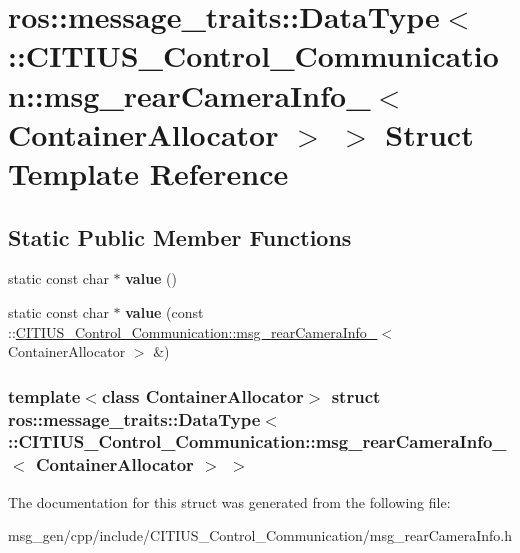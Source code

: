 \hypertarget{structros_1_1message__traits_1_1_data_type_3_01_1_1_c_i_t_i_u_s___control___communication_1_1msgbd70593100054f1c15bc64e53c04fa51}{\section{ros\-:\-:message\-\_\-traits\-:\-:\-Data\-Type$<$ \-:\-:\-C\-I\-T\-I\-U\-S\-\_\-\-Control\-\_\-\-Communication\-:\-:msg\-\_\-rear\-Camera\-Info\-\_\-$<$ \-Container\-Allocator $>$ $>$ \-Struct \-Template \-Reference}
\label{structros_1_1message__traits_1_1_data_type_3_01_1_1_c_i_t_i_u_s___control___communication_1_1msgbd70593100054f1c15bc64e53c04fa51}
}
\subsection*{\-Static \-Public \-Member \-Functions}
\begin{DoxyCompactItemize}
\item 
\hypertarget{structros_1_1message__traits_1_1_data_type_3_01_1_1_c_i_t_i_u_s___control___communication_1_1msgbd70593100054f1c15bc64e53c04fa51_af728ed2c05e40191b0fa31083e806a2a}{static const char $\ast$ {\bfseries value} ()}\label{structros_1_1message__traits_1_1_data_type_3_01_1_1_c_i_t_i_u_s___control___communication_1_1msgbd70593100054f1c15bc64e53c04fa51_af728ed2c05e40191b0fa31083e806a2a}

\item 
\hypertarget{structros_1_1message__traits_1_1_data_type_3_01_1_1_c_i_t_i_u_s___control___communication_1_1msgbd70593100054f1c15bc64e53c04fa51_ad3b3e2f3cbcb9c596cf83367c9606c5b}{static const char $\ast$ {\bfseries value} (const \-::\hyperlink{struct_c_i_t_i_u_s___control___communication_1_1msg__rear_camera_info__}{\-C\-I\-T\-I\-U\-S\-\_\-\-Control\-\_\-\-Communication\-::msg\-\_\-rear\-Camera\-Info\-\_\-}$<$ \-Container\-Allocator $>$ \&)}\label{structros_1_1message__traits_1_1_data_type_3_01_1_1_c_i_t_i_u_s___control___communication_1_1msgbd70593100054f1c15bc64e53c04fa51_ad3b3e2f3cbcb9c596cf83367c9606c5b}

\end{DoxyCompactItemize}
\subsubsection*{template$<$class Container\-Allocator$>$ struct ros\-::message\-\_\-traits\-::\-Data\-Type$<$ \-::\-C\-I\-T\-I\-U\-S\-\_\-\-Control\-\_\-\-Communication\-::msg\-\_\-rear\-Camera\-Info\-\_\-$<$ Container\-Allocator $>$ $>$}



\-The documentation for this struct was generated from the following file\-:\begin{DoxyCompactItemize}
\item 
msg\-\_\-gen/cpp/include/\-C\-I\-T\-I\-U\-S\-\_\-\-Control\-\_\-\-Communication/msg\-\_\-rear\-Camera\-Info.\-h\end{DoxyCompactItemize}
